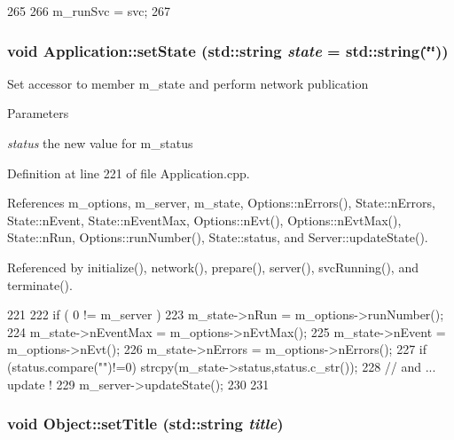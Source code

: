 \begin{DoxyCode}
265                                {
266     m_runSvc = svc;
267   }
\end{DoxyCode}
\hypertarget{classApplication_a4a86c9bbf7851753c7b2bc03211092fb}{
\subsubsection[{setState}]{\setlength{\rightskip}{0pt plus 5cm}void Application::setState (std::string {\em state} = {\ttfamily std::string(\char`\"{}\char`\"{})})}}
\label{classApplication_a4a86c9bbf7851753c7b2bc03211092fb}
Set accessor to member m\_\-state and perform network publication 
\begin{DoxyParams}{Parameters}
\item[{\em status}]the new value for m\_\-status \end{DoxyParams}


Definition at line 221 of file Application.cpp.

References m\_\-options, m\_\-server, m\_\-state, Options::nErrors(), State::nErrors, State::nEvent, State::nEventMax, Options::nEvt(), Options::nEvtMax(), State::nRun, Options::runNumber(), State::status, and Server::updateState().

Referenced by initialize(), network(), prepare(), server(), svcRunning(), and terminate().


\begin{DoxyCode}
221                                             {
222   if ( 0 != m_server ) {
223     m_state->nRun      = m_options->runNumber();
224     m_state->nEventMax = m_options->nEvtMax();
225     m_state->nEvent    = m_options->nEvt();
226     m_state->nErrors   = m_options->nErrors();
227     if (status.compare("")!=0) strcpy(m_state->status,status.c_str());
228     // and ... update !
229     m_server->updateState();
230   }
231 }
\end{DoxyCode}
\hypertarget{classObject_a89557dbbad5bcaa02652f5d7fa35d20f}{
\subsubsection[{setTitle}]{\setlength{\rightskip}{0pt plus 5cm}void Object::setTitle (std::string {\em title})}}
\label{classObject_a89557dbbad5bcaa02652f5d7fa35d20f}


